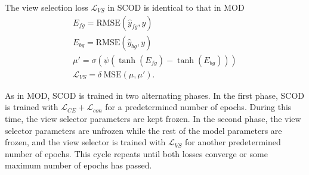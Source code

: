 The view selection loss $\mathcal{L}_{VS}$ in SCOD is identical to that in MOD
\begin{equation}
\begin{aligned}
    E_{fg} = \text{RMSE}(\hat{y}_{fg}, y) \\
    E_{bg} = \text{RMSE}(\hat{y}_{bg}, y) \\
    \mu' = \sigma(\psi(\tanh(E_{fg}) - \tanh(E_{bg}))) \\
    \mathcal{L}_{VS} = \delta ~\text{MSE}(\mu, \mu').
\end{aligned}
\end{equation}

As in MOD, SCOD is trained in two alternating phases. In the first phase, SCOD is trained with $\mathcal{L}_{CE} + \mathcal{L}_{con}$ for a predetermined number of epochs. During this time, the view selector parameters are kept frozen. In the second phase, the view selector parameters are unfrozen while the rest of the model parameters are frozen, and the view selector is trained with $\mathcal{L}_{VS}$ for another predetermined number of epochs. This cycle repeats until both losses converge or some maximum number of epochs has passed.

